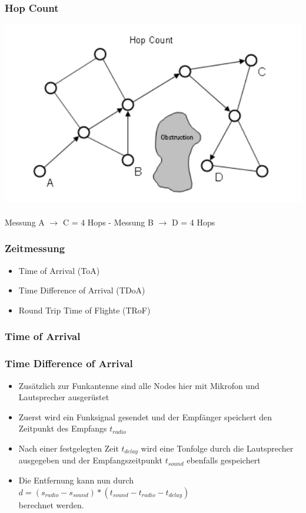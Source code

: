 \begin{frame}
  \frametitle{Hop Count}

  \begin{center}
  \includegraphics[scale=0.5]{img/hop_count1}
  \\~\\
  Messung A $\to$ C = 4 Hops - Messung B $\to$ D = 4 Hops
  \end{center}
\end{frame}

\begin{frame}
\frametitle{Zeitmessung}

\begin{itemize}
  \item Time of Arrival (ToA)
  \item Time Difference of Arrival (TDoA)
  \item Round Trip Time of Flighte (TRoF)
\end{itemize}
\end{frame}

\begin{frame}
\frametitle{Time of Arrival}

\end{frame}

\begin{frame}
\frametitle{Time Difference of Arrival}
\begin{itemize}
  \item Zusätzlich zur Funkantenne sind alle Nodes hier mit Mikrofon und Lautsprecher ausgerüstet
  \item Zuerst wird ein Funksignal gesendet und der Empfänger speichert den Zeitpunkt des Empfangs $t_{radio}$
  \item Nach einer festgelegten Zeit $t_{delay}$ wird eine Tonfolge durch die Lautsprecher ausgegeben und der Empfangszeitpunkt $t_{sound}$ ebenfalls gespeichert
  \item Die Entfernung kann nun durch $d = (s_{radio} - s_{sound}) * (t_{sound} - t_{radio} - t_{delay})$ \\berechnet werden.
\end{itemize}
\end{frame}

